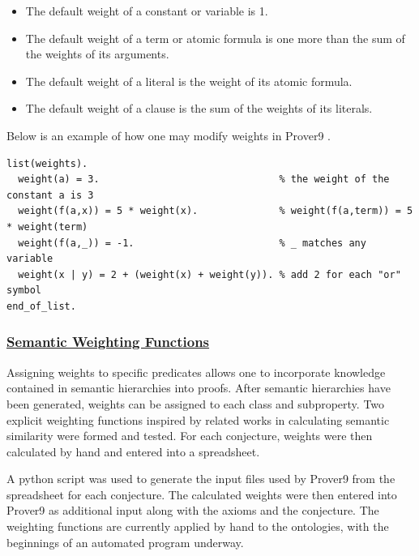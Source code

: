\documentclass{article}
\begin{document}
\begin{singlespace}
\centering
\begin{itemize}
    \item The default weight of a constant or variable is 1.
    \item The default weight of a term or atomic formula is one more than the sum of the weights of its arguments.
    \item The default weight of a literal is the weight of its atomic formula.
    \item The default weight of a clause is the sum of the weights of its literals.
\end{itemize}
\end{singlespace}

Below is an example of how one may modify weights in Prover9  \cite{mccune2005prover9}. 

\begin{singlespace}
\centering
\begin{verbatim}
list(weights).
  weight(a) = 3.                               % the weight of the constant a is 3
  weight(f(a,x)) = 5 * weight(x).              % weight(f(a,term)) = 5 * weight(term)
  weight(f(a,_)) = -1.                         % _ matches any variable
  weight(x | y) = 2 + (weight(x) + weight(y)). % add 2 for each "or" symbol
end_of_list.
\end{verbatim}
\end{singlespace}

\subsubsection{\underline{Semantic Weighting Functions}}
Assigning weights to specific predicates allows one to incorporate knowledge contained in semantic hierarchies into proofs. After semantic hierarchies have been generated, weights can be assigned to each class and subproperty. Two explicit weighting functions inspired by related works in calculating semantic similarity were formed and tested. For each conjecture, weights were then calculated by hand and entered into a spreadsheet. 

A python script was used to generate the input files used by Prover9 from the spreadsheet for each conjecture. The calculated weights were then entered into Prover9 as additional input along with the axioms and the conjecture. The weighting functions are currently applied by hand to the ontologies, with the beginnings of an automated program underway. 
\end{document}

